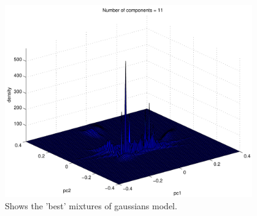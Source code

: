 \begin{figure}[!htbp]
  \centering
  \includegraphics[width=0.95\textwidth]{./images/q37mogbest}
  \caption{Shows the 'best' mixtures of gaussians model.}
  \label{fig:q37mogbest}
\end{figure}
